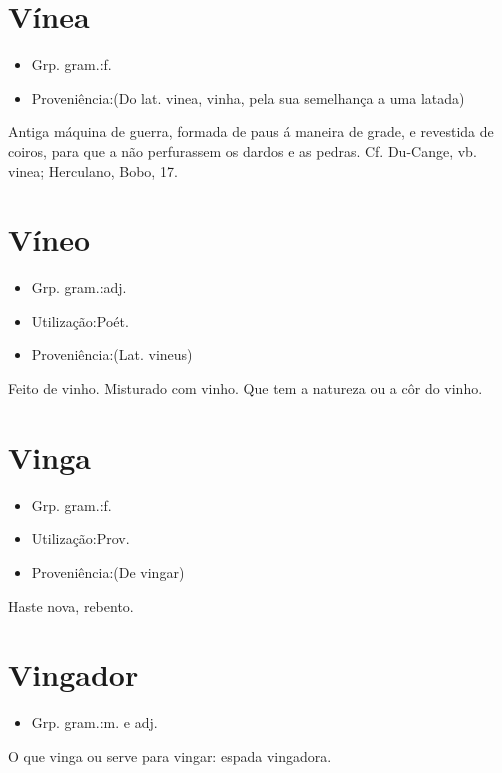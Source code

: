 \documentclass{article}
\begin{document}
\section{Vínea}
\begin{itemize}
\item {Grp. gram.:f.}
\end{itemize}
\begin{itemize}
\item {Proveniência:(Do lat. \textunderscore vinea\textunderscore , vinha, pela sua semelhança a uma latada)}
\end{itemize}
Antiga máquina de guerra, formada de paus á maneira de grade, e revestida de coiros, para que a não perfurassem os dardos e as pedras. Cf. Du-Cange, vb. \textunderscore vinea\textunderscore ; Herculano, \textunderscore Bobo\textunderscore , 17.
\section{Víneo}
\begin{itemize}
\item {Grp. gram.:adj.}
\end{itemize}
\begin{itemize}
\item {Utilização:Poét.}
\end{itemize}
\begin{itemize}
\item {Proveniência:(Lat. \textunderscore vineus\textunderscore )}
\end{itemize}
Feito de vinho.
Misturado com vinho.
Que tem a natureza ou a côr do vinho.
\section{Vinga}
\begin{itemize}
\item {Grp. gram.:f.}
\end{itemize}
\begin{itemize}
\item {Utilização:Prov.}
\end{itemize}
\begin{itemize}
\item {Proveniência:(De \textunderscore vingar\textunderscore )}
\end{itemize}
Haste nova, rebento.
\section{Vingador}
\begin{itemize}
\item {Grp. gram.:m.  e  adj.}
\end{itemize}
O que vinga ou serve para vingar: \textunderscore espada vingadora\textunderscore .
\end{document}
